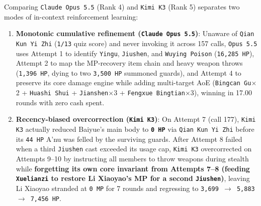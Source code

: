 \documentclass[11pt,a4paper]{article}
\begin{document}
Comparing \texttt{Claude\allowbreak{} \allowbreak{}Opus\allowbreak{} \allowbreak{}5\allowbreak{}.\allowbreak{}5} (Rank 4) and \texttt{Kimi\allowbreak{} \allowbreak{}K3} (Rank 5) separates two modes of in-context reinforcement learning:
\begin{enumerate}
\item \textbf{Monotonic cumulative refinement (\texttt{Claude\allowbreak{} \allowbreak{}Opus\allowbreak{} \allowbreak{}5\allowbreak{}.\allowbreak{}5})}: Unaware of \texttt{Qian\allowbreak{} \allowbreak{}Kun\allowbreak{} \allowbreak{}Yi\allowbreak{} \allowbreak{}Zhi} (\texttt{1\allowbreak{}/\allowbreak{}13} quiz score) and never invoking it across 157 calls, \texttt{Opus\allowbreak{} \allowbreak{}5\allowbreak{}.\allowbreak{}5} uses Attempt 1 to identify \texttt{Yingu}, \texttt{Jiushen}, and \texttt{Wuying\allowbreak{} \allowbreak{}Poison} (\texttt{16\allowbreak{},\allowbreak{}285\allowbreak{} \allowbreak{}HP}), Attempt 2 to map the MP-recovery item chain and heavy weapon throws (\texttt{1\allowbreak{},\allowbreak{}396\allowbreak{} \allowbreak{}HP}, dying to two \texttt{3\allowbreak{},\allowbreak{}500\allowbreak{} \allowbreak{}HP} summoned guards), and Attempt 4 to preserve its core damage engine while adding multi-target AoE (\texttt{Bingcan\allowbreak{} \allowbreak{}Gu}\ensuremath{\times}2 + \texttt{Huashi\allowbreak{} \allowbreak{}Shui} + \texttt{Jianshen}\ensuremath{\times}3 + \texttt{Fengxue\allowbreak{} \allowbreak{}Bingtian}\ensuremath{\times}3), winning in 17.00 rounds with zero cash spent.
\item \textbf{Recency-biased overcorrection (\texttt{Kimi\allowbreak{} \allowbreak{}K3})}: On Attempt 7 (call 177), \texttt{Kimi\allowbreak{} \allowbreak{}K3} actually reduced Baiyue's main body to \textbf{\texttt{0\allowbreak{} \allowbreak{}HP}} via \texttt{Qian\allowbreak{} \allowbreak{}Kun\allowbreak{} \allowbreak{}Yi\allowbreak{} \allowbreak{}Zhi} before its \texttt{44\allowbreak{} \allowbreak{}HP} A'nu was felled by the surviving guards. After Attempt 8 failed when a third \texttt{Jiushen} cast exceeded its usage cap, \texttt{Kimi\allowbreak{} \allowbreak{}K3} overcorrected on Attempts 9--10 by instructing all members to throw weapons during stealth while \textbf{forgetting its own core invariant from Attempts 7--8 (feeding \texttt{Xuelianzi} to restore Li Xiaoyao's MP for a second \texttt{Jiushen})}, leaving Li Xiaoyao stranded at \texttt{0\allowbreak{} \allowbreak{}MP} for 7 rounds and regressing to \texttt{3\allowbreak{},\allowbreak{}699\allowbreak{} \allowbreak{}\ensuremath{\rightarrow}\allowbreak{} \allowbreak{}5\allowbreak{},\allowbreak{}883\allowbreak{} \allowbreak{}\ensuremath{\rightarrow}\allowbreak{} \allowbreak{}7\allowbreak{},\allowbreak{}456\allowbreak{} \allowbreak{}HP}.

\end{enumerate}
\end{document}
